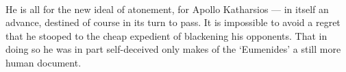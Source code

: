 \documentclass[a4paper, 11pt, oneside, polutonikogreek, english]{article}
\begin{document}
\paragraph{}
He is all for the new ideal of atonement, for Apollo Katharsios --- in itself an advance, destined of course in its turn to pass. It is impossible to avoid a regret that he stooped to the cheap expedient of blackening his opponents. That in doing so he was in part self-deceived only makes of the `Eumenides' a still more human document.
\end{document}
